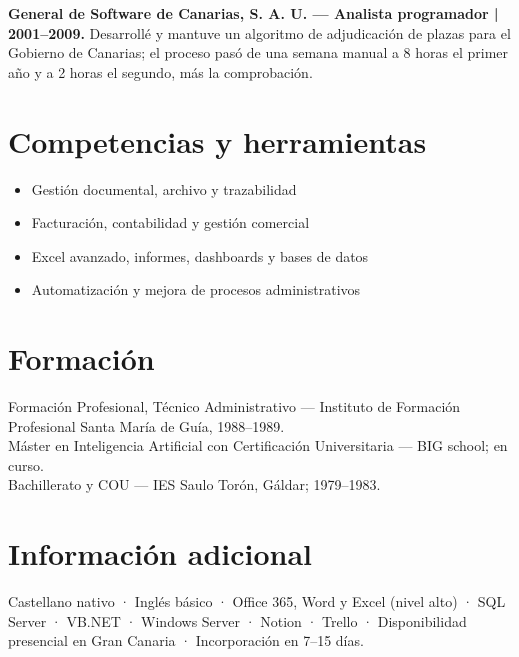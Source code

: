 \documentclass[10pt,a4paper]{article}
\begin{document}
\textbf{General de Software de Canarias, S. A. U. — Analista programador | 2001--2009.} Desarrollé y mantuve un algoritmo de adjudicación de plazas para el Gobierno de Canarias; el proceso pasó de una semana manual a 8 horas el primer año y a 2 horas el segundo, más la comprobación.
\section*{Competencias y herramientas}
\begin{itemize}[leftmargin=*,itemsep=0pt]
\item Gestión documental, archivo y trazabilidad
\item Facturación, contabilidad y gestión comercial
\item Excel avanzado, informes, dashboards y bases de datos
\item Automatización y mejora de procesos administrativos
\end{itemize}
\section*{Formación}
Formación Profesional, Técnico Administrativo — Instituto de Formación Profesional Santa María de Guía, 1988--1989.\\
Máster en Inteligencia Artificial con Certificación Universitaria — BIG school; en curso.\\
Bachillerato y COU — IES Saulo Torón, Gáldar; 1979--1983.
\section*{Información adicional}
Castellano nativo · Inglés básico · Office 365, Word y Excel (nivel alto) · SQL Server · VB.NET · Windows Server · Notion · Trello · Disponibilidad presencial en Gran Canaria · Incorporación en 7--15 días.
\end{document}
